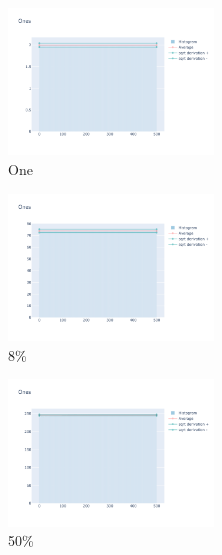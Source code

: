 \documentclass[12pt, fleqn]{report}                             %
\theoremstyle{break}                                            %
\begin{document}
      \begin{figure}[ht!]
        \centering
        \begin{subfigure}[b]{0.4\linewidth}
          \includegraphics[width=0.6\textwidth]{Images/142/dia-a.png}
          \caption{One}
        \end{subfigure}
        \begin{subfigure}[b]{0.4\linewidth}
          \includegraphics[width=0.6\textwidth]{Images/142/dia-b.png}
          \caption{8\%}
        \end{subfigure}
        \begin{subfigure}[b]{0.4\linewidth}
          \includegraphics[width=0.6\textwidth]{Images/142/dia-c.png}
          \caption{50\%}
        \end{subfigure}
        \begin{subfigure}[b]{0.4\linewidth}

\end{subfigure}
\end{figure}
\end{document}
